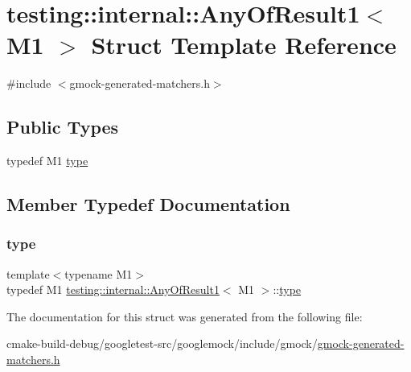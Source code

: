 \hypertarget{structtesting_1_1internal_1_1AnyOfResult1}{}\section{testing\+::internal\+::Any\+Of\+Result1$<$ M1 $>$ Struct Template Reference}
\label{structtesting_1_1internal_1_1AnyOfResult1}


{\ttfamily \#include $<$gmock-\/generated-\/matchers.\+h$>$}

\subsection*{Public Types}
\begin{DoxyCompactItemize}
\item 
typedef M1 \mbox{\hyperlink{structtesting_1_1internal_1_1AnyOfResult1_a4c55b5cf196c93e2a822bc99625f6797}{type}}
\end{DoxyCompactItemize}


\subsection{Member Typedef Documentation}
\mbox{\label{structtesting_1_1internal_1_1AnyOfResult1_a4c55b5cf196c93e2a822bc99625f6797}} 
\subsubsection{\texorpdfstring{type}{type}}
{\footnotesize\ttfamily template$<$typename M1$>$ \\
typedef M1 \mbox{\hyperlink{structtesting_1_1internal_1_1AnyOfResult1}{testing\+::internal\+::\+Any\+Of\+Result1}}$<$ M1 $>$\+::\mbox{\hyperlink{structtesting_1_1internal_1_1AnyOfResult1_a4c55b5cf196c93e2a822bc99625f6797}{type}}}



The documentation for this struct was generated from the following file\+:\begin{DoxyCompactItemize}
\item 
cmake-\/build-\/debug/googletest-\/src/googlemock/include/gmock/\mbox{\hyperlink{gmock-generated-matchers_8h}{gmock-\/generated-\/matchers.\+h}}\end{DoxyCompactItemize}
